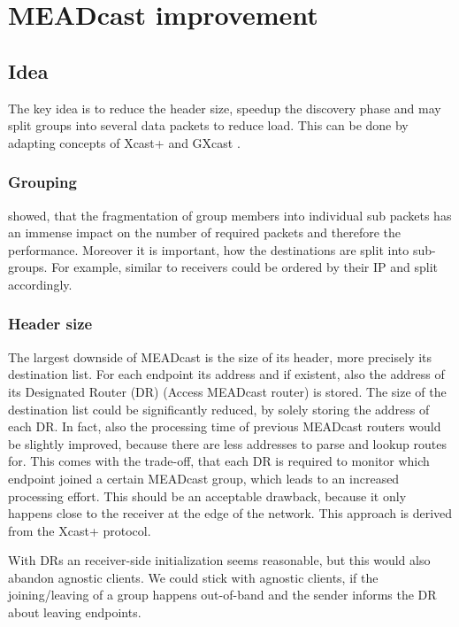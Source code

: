 \chapter{MEADcast improvement}


\section{Idea} %
\label{sec:Idea}
The key idea is to reduce the header size, speedup the discovery phase and
may split groups into several data packets to reduce load.
This can be done by adapting concepts of Xcast+ \cite{xcast+} and GXcast
\cite{gxcast}.

\subsection{Grouping} %
\label{sub:Grouping}
\cite{gxcast} showed, that the fragmentation of group members into individual 
sub packets has an immense impact on the number of required packets and
therefore the performance.
Moreover it is important, how the destinations are split into sub-groups.
For example, similar to \cite{gxcast} receivers could be ordered by their IP and 
split accordingly.

\subsection{Header size} %
\label{sub:Header size}
The largest downside of MEADcast is the size of its header, more precisely its
destination list.
For each endpoint its address and if existent, also the address of its
Designated Router (DR) (Access MEADcast router) is stored.
The size of the destination list could be significantly reduced, by solely
storing the address of each DR.
In fact, also the processing time of previous MEADcast routers would be slightly
improved, because there are less addresses to parse and lookup routes for.
This comes with the trade-off, that each DR is required to monitor which
endpoint joined a certain MEADcast group, which leads to an increased processing
effort.
This should be an acceptable drawback, because it only happens close to the
receiver at the edge of the network.
This approach is derived from the Xcast+ protocol. \cite{xcast+}

With DRs an receiver-side initialization seems reasonable, but this would also
abandon agnostic clients.
We could stick with agnostic clients, if the joining/leaving of a group happens
out-of-band and the sender informs the DR about leaving endpoints.


